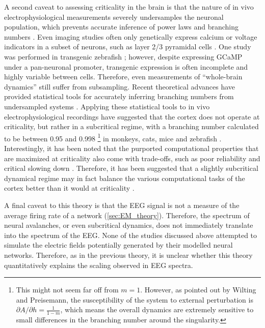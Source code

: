 A second caveat to assessing criticality in the brain is that the nature of in vivo electrophysiological measurements severely undersamples the neuronal population, which prevents accurate inference of power laws and branching numbers \cite{Priesemann2009}. Even imaging studies often only genetically express calcium or voltage indicators in a subset of neurons, such as layer 2/3 pyramidal cells \cite{Scott2014,Bellay2015}. One study was performed in transgenic zebrafish \cite{Ponce-Alvarez2018}; however, despite expressing GCaMP under a pan-neuronal promoter, transgenic expression is often incomplete and highly variable between cells. Therefore, even measurements of ``whole-brain dynamics'' still suffer from subsampling. Recent theoretical advances have provided statistical tools for accurately inferring branching numbers from undersampled systems \cite{Wilting2018}. Applying these statistical tools to in vivo electrophysiological recordings have suggested that the cortex does not operate at criticality, but rather in a subcritical regime, with a branching number calculated to be between 0.95 and 0.998 \footnote[2]{This might not seem far off from $m=1$. However, as pointed out by Wilting and Preisemann\cite{Wilting2019}, the susceptibility of the system to external perturbation is $\partial A/\partial h = \frac{1}{1-m}$, which means the overall dynamics are extremely sensitive to small differences in the branching number around the singularity.} in monkeys, cats, mice \cite{Wilting2018,Wilting2019} and zebrafish \cite{Suryadi2022}. Interestingly, it has been noted that the purported computational properties that are maximized at criticality also come with trade-offs, such as poor reliability \cite{Gollo2017} and critical slowing down \cite{Scheffer2012, Wilting2019a}. Therefore, it has been suggested that a slightly subcritical dynamical regime may in fact balance the various computational tasks of the cortex better than it would at criticality \cite{Wilting2019a}.

A final caveat to this theory is that the EEG signal is not a measure of the average firing rate of a network (\autoref{sec:EM_theory}). Therefore, the spectrum of neural avalanches, or even subcritical dynamics, does not immediately translate into the spectrum of the EEG. None of the studies discussed above attempted to simulate the electric fields potentially generated by their modelled neural networks.  Therefore, as in the previous theory, it is unclear whether this theory quantitatively explains the scaling observed in EEG spectra.

